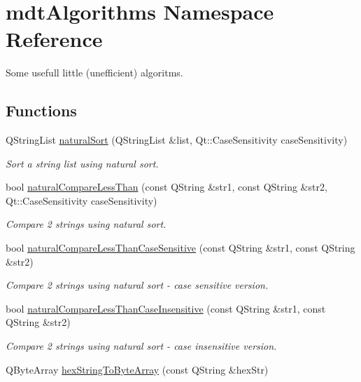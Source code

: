 \hypertarget{namespacemdt_algorithms}{\section{mdt\-Algorithms Namespace Reference}
\label{namespacemdt_algorithms}
}


Some usefull little (unefficient) algoritms.  


\subsection*{Functions}
\begin{DoxyCompactItemize}
\item 
Q\-String\-List \hyperlink{namespacemdt_algorithms_a32a09ec3855b605b6e455ea418502aeb}{natural\-Sort} (Q\-String\-List \&list, Qt\-::\-Case\-Sensitivity case\-Sensitivity)
\begin{DoxyCompactList}\small\item\em Sort a string list using natural sort. \end{DoxyCompactList}\item 
bool \hyperlink{namespacemdt_algorithms_af22a54e83499afe31d22fac9bc521c54}{natural\-Compare\-Less\-Than} (const Q\-String \&str1, const Q\-String \&str2, Qt\-::\-Case\-Sensitivity case\-Sensitivity)
\begin{DoxyCompactList}\small\item\em Compare 2 strings using natural sort. \end{DoxyCompactList}\item 
bool \hyperlink{namespacemdt_algorithms_aa5af30feb9cfecb2971d6ae90c9c5fdf}{natural\-Compare\-Less\-Than\-Case\-Sensitive} (const Q\-String \&str1, const Q\-String \&str2)
\begin{DoxyCompactList}\small\item\em Compare 2 strings using natural sort -\/ case sensitive version. \end{DoxyCompactList}\item 
bool \hyperlink{namespacemdt_algorithms_a3cdc3655f7adfbc5ce03fd39e8d1e986}{natural\-Compare\-Less\-Than\-Case\-Insensitive} (const Q\-String \&str1, const Q\-String \&str2)
\begin{DoxyCompactList}\small\item\em Compare 2 strings using natural sort -\/ case insensitive version. \end{DoxyCompactList}\item 
Q\-Byte\-Array \hyperlink{namespacemdt_algorithms_a5094251abb1557b9b4717b3a0f1a8535}{hex\-String\-To\-Byte\-Array} (const Q\-String \&hex\-Str)

\end{DoxyCompactItemize}
